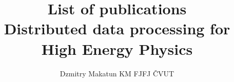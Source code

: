 \documentclass{article}
\title{List of publications \\ \large Distributed data processing for High Energy Physics }
\author{Dzmitry Makatun KM FJFJ {\v{C}}VUT}
\begin{document}
\maketitle
\nocite{MISTA, ACAT_cp, Makatun_cache, ddny14, ddny13, ddny12}
\nocite{STARmeeting2015, Brno_presentation, Australia_presentation, tcsc_presentation, STARmeeting2013}



\printbibliography[keyword=my,heading=subbibliography,title={Publications}]
\printbibliography[keyword=my_presentaion,heading=subbibliography,title={Presentations}]
\end{document}

